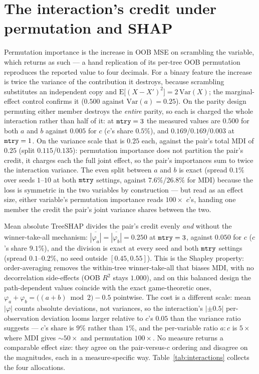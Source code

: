 \section{The interaction's credit under permutation and SHAP}
\label{app:interactions}

Permutation importance is the increase in OOB MSE on scrambling the variable,
which  returns as such --- a hand replication of its per-tree OOB
permutation reproduces the reported value to four decimals. For a binary
feature the increase is twice the variance of the contribution it destroys,
because scrambling substitutes an independent copy and
$\mathrm{E}\big[(X-X')^2\big] = 2\,\mathrm{Var}(X)$; the marginal-effect control
confirms it ($0.500$ against $\mathrm{Var}(a) = 0.25$). On the parity design
permuting either member destroys the \emph{entire} parity, so each is charged
the whole interaction rather than half of it: at $\texttt{mtry}=3$ the measured
values are $0.500$ for both $a$ and $b$ against $0.005$ for $c$ ($c$'s share
$0.5\%$), and $0.169$/$0.169$/$0.003$ at $\texttt{mtry}=1$. On the variance
scale that is $0.25$ each, against the pair's total MDI of $0.25$ (split
$0.115$/$0.135$): permutation importance does not partition the pair's credit,
it charges each the full joint effect, so the pair's importances sum to twice
the interaction variance. The even split between $a$ and $b$ is exact (spread
$0.1\%$ over seeds $1$--$10$ at both $\texttt{mtry}$ settings, against
$7.6\%$/$26.8\%$ for MDI) because the loss is symmetric in the two variables by
construction --- but read as an effect size, either variable's permutation
importance reads $100\times$ $c$'s, handing one member the credit the pair's
joint variance shares between the two.

Mean absolute TreeSHAP divides the pair's credit evenly \emph{and} without the
winner-take-all mechanism: $\overline{|\varphi_a|} = \overline{|\varphi_b|} =
0.250$ at $\texttt{mtry}=3$, against $0.050$ for $c$ ($c$'s share $9.1\%$), and
the division is exact at every seed and both $\texttt{mtry}$ settings (spread
$0.1$--$0.2\%$, no seed outside $[0.45, 0.55]$). This is the Shapley property:
order-averaging removes the within-tree winner-take-all that biases MDI, with
no decorrelation side-effects (OOB $R^2$ stays $1.000$), and on this balanced
design the path-dependent values coincide with the exact game-theoretic ones,
$\varphi_a + \varphi_b = \big((a+b) \bmod 2\big) - 0.5$ pointwise. The cost is
a different scale: mean $|\varphi|$ counts absolute deviations, not variances,
so the interaction's $|\pm 0.5|$ per-observation deviation looms larger
relative to $c$'s $0.05$ than the variance ratio suggests --- $c$'s share is
$9\%$ rather than $1\%$, and the per-variable ratio $a:c$ is $5\times$ where MDI
gives $\sim 50\times$ and permutation $100\times$. No measure returns a
comparable effect size: they agree on the pair-versus-$c$ ordering and disagree
on the magnitudes, each in a measure-specific way. Table~\ref{tab:interactions}
collects the four allocations.
